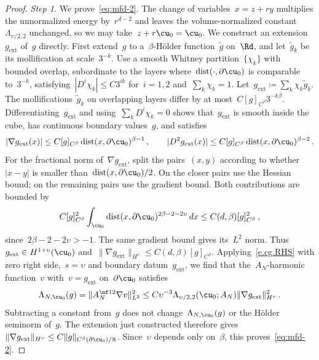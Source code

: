 \documentclass[11pt]{amsart}
\begin{document}
\begin{proof}
\emph{Step 1.} We prove~\eqref{eq:mfd-2}. The change of variables~$x=z+ry$ multiplies the unnormalized energy by~$r^{d-2}$ and leaves the volume-normalized constant~$\Lambda_{\upsilon/2,2}$ unchanged, so we may take~$z+r\cu_0=\cu_0$. We construct an extension~$g_{\mathrm{ext}}$ of~$g$ directly. First extend~$g$ to a~$\beta$-H\"older function~$\tilde g$ on~$\Rd$, and let~$\tilde g_k$ be its mollification at scale~$3^{-k}$. Use a smooth Whitney partition~$\{\chi_k\}$ with bounded overlap, subordinate to the layers where~$\operatorname{dist}(\cdot,\partial\cu_0)$ is comparable to~$3^{-k}$, satisfying~$|D^i\chi_k|\leq C3^{ik}$ for~$i=1,2$ and~$\sum_k\chi_k=1$. Let~$g_{\mathrm{ext}}\coloneqq\sum_k\chi_k\tilde g_k$. The mollifications~$\tilde g_k$ on overlapping layers differ by at most~$C[g]_{C^\beta}3^{-k\beta}$. Differentiating~$g_{\mathrm{ext}}$ and using~$\sum_kD^i\chi_k=0$ shows that~$g_{\mathrm{ext}}$ is smooth inside the cube, has continuous boundary values~$g$, and satisfies
\begin{equation*}
	|\nabla g_{\mathrm{ext}}(x)|\leq C[g]_{C^\beta}\operatorname{dist}(x,\partial\cu_0)^{\beta-1}\,,
	\qquad |D^2g_{\mathrm{ext}}(x)|\leq C[g]_{C^\beta}\operatorname{dist}(x,\partial\cu_0)^{\beta-2}\,.
\end{equation*}
For the fractional norm of~$\nabla g_{\mathrm{ext}}$, split the pairs~$(x,y)$ according to whether~$|x-y|$ is smaller than~$\operatorname{dist}(x,\partial\cu_0)/2$. On the closer pairs use the Hessian bound; on the remaining pairs use the gradient bound. Both contributions are bounded by
\begin{equation*}
	C[g]_{C^\beta}^2\int_{\cu_0}\operatorname{dist}(x,\partial\cu_0)^{2\beta-2-2\upsilon}\,dx
	\leq C(d,\beta)[g]_{C^\beta}^2\,,
\end{equation*}
since~$2\beta-2-2\upsilon>-1$. The same gradient bound gives its~$L^2$ norm. Thus~$g_{\mathrm{ext}}\in H^{1+\upsilon}(\cu_0)$ and~$\|\nabla g_{\mathrm{ext}}\|_{H^\upsilon}\leq C(d,\beta)[g]_{C^\beta}$. Applying~\eqref{e.cg.RHS} with zero right side,~$s=\upsilon$ and boundary datum~$g_{\mathrm{ext}}$, we find that the~$A_N$-harmonic function~$v$ with~$v=g_{\mathrm{ext}}$ on~$\partial \cu_0$ satisfies
\begin{equation*}
	\Lambda_{N,\cu_0}(g)=\|A_N^{\nf12}\nabla v\|_{L^2}^2
	\leq C\upsilon^{-3}\Lambda_{\upsilon/2,2}(\cu_0;A_N)
	\|\nabla g_{\mathrm{ext}}\|_{H^\upsilon}^2\,.
\end{equation*}
Subtracting a constant from~$g$ does not change~$\Lambda_{N,\cu_0}(g)$ or the H\"older seminorm of~$g$. The extension just constructed therefore gives~$\|\nabla g_{\mathrm{ext}}\|_{H^\upsilon}\leq C\|g\|_{C^\beta(\partial \cu_0)/\mathbb R}$. Since~$\upsilon$ depends only on~$\beta$, this proves~\eqref{eq:mfd-2}.


\end{proof}
\end{document}
